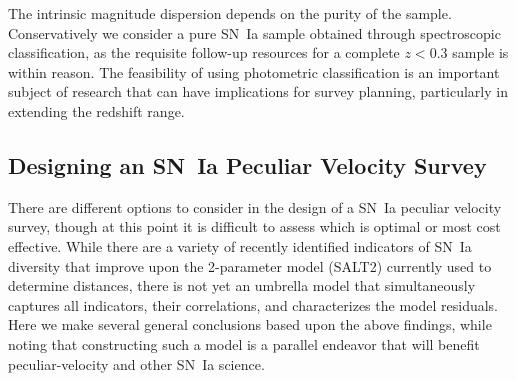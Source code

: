 \documentclass{aastex62}   	%
\begin{document}
\begin{itemize}
The intrinsic magnitude dispersion depends on the purity of the sample. Conservatively we consider
a pure SN~Ia sample obtained through
spectroscopic classification, as the requisite follow-up resources for a  complete $z<0.3$ sample is within reason. 
The feasibility of using photometric classification is an important subject of research
that can have implications for survey planning, particularly in extending the redshift range.
\end{itemize}

\subsection{Designing an SN~Ia Peculiar Velocity Survey}
There are different options to consider in the design of a SN~Ia peculiar velocity survey, though at this point it is difficult to assess which is optimal
or most cost effective.  While there are a variety
of recently identified indicators of SN~Ia diversity that improve upon the 2-parameter model (SALT2) currently used to determine distances, 
there is not yet an umbrella model that simultaneously captures all indicators, their correlations, and characterizes the model residuals.
Here we  make several general conclusions
based upon the above findings, while noting that 
constructing such a model is a parallel
endeavor that will benefit peculiar-velocity  and other SN~Ia science. 
\end{document}
